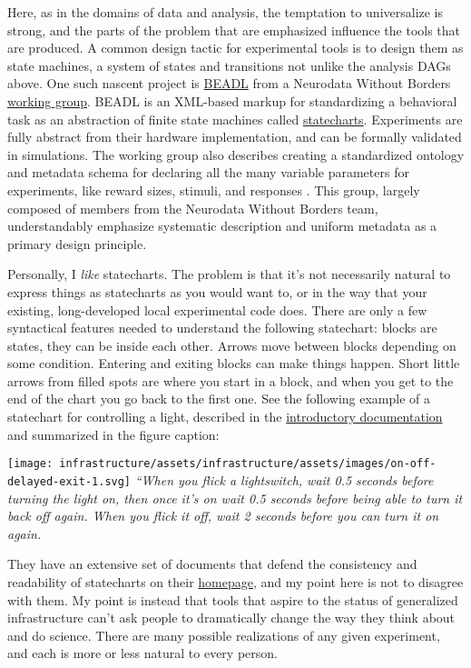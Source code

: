 Here, as in the domains of data and analysis, the temptation to
universalize is strong, and the parts of the problem that are emphasized
influence the tools that are produced. A common design tactic for
experimental tools is to design them as state machines, a system of
states and transitions not unlike the analysis DAGs above. One such
nascent project is
\href{https://archive.org/details/beadl-xml-documentation-v-0.1/mode/2up}{BEADL}
\citep{wulfBEADLXMLDocumentation2020}  from a Neurodata Without
Borders
\href{https://archive.org/details/nwb-behavioral-task-wg}{working
group}. BEADL is an XML-based markup for standardizing a behavioral task
as an abstraction of finite state machines called
\href{https://statecharts.github.io/}{statecharts}. Experiments are
fully abstract from their hardware implementation, and can be formally
validated in simulations. The working group also describes creating a
standardized ontology and metadata schema for declaring all the many
variable parameters for experiments, like reward sizes, stimuli, and
responses \citep{nwbbehavioraltaskwgNWBBehavioralTask2020} . This
group, largely composed of members from the Neurodata Without Borders
team, understandably emphasize systematic description and uniform
metadata as a primary design principle.

Personally, I \emph{like} statecharts. The problem is that it's not
necessarily natural to express things as statecharts as you would want
to, or in the way that your existing, long-developed local experimental
code does. There are only a few syntactical features needed to
understand the following statechart: blocks are states, they can be
inside each other. Arrows move between blocks depending on some
condition. Entering and exiting blocks can make things happen. Short
little arrows from filled spots are where you start in a block, and when
you get to the end of the chart you go back to the first one. See the
following example of a statechart for controlling a light, described in
the \href{https://statecharts.dev/on-off-statechart.html}{introductory
documentation} and summarized in the figure caption:

\texttt{[image: infrastructure/assets/infrastructure/assets/images/on-off-delayed-exit-1.svg]}
\emph{``When you flick a lightswitch, wait 0.5 seconds before turning
the light on, then once it's on wait 0.5 seconds before being able to
turn it back off again. When you flick it off, wait 2 seconds before you
can turn it on again.}

They have an extensive set of documents that defend the consistency and
readability of statecharts on their
\href{https://statecharts.dev/}{homepage}, and my point here is not to
disagree with them. My point is instead that tools that aspire to the
status of generalized infrastructure can't ask people to dramatically
change the way they think about and do science. There are many possible
realizations of any given experiment, and each is more or less natural
to every person.

